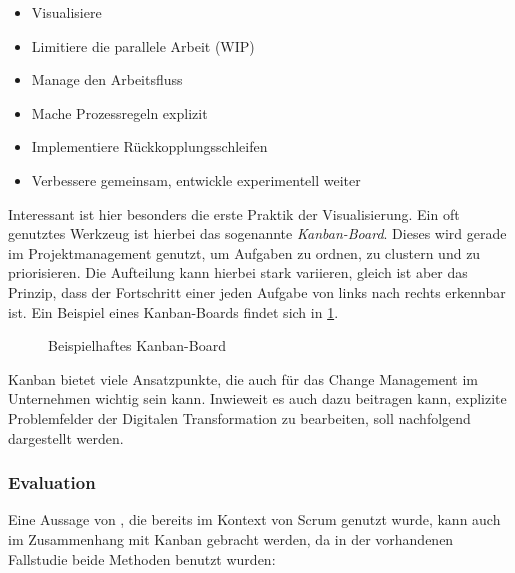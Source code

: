 \begin{itemize}[noitemsep, topsep=0pt]
	\item Visualisiere
	\item Limitiere die parallele Arbeit (WIP)
	\item Manage den Arbeitsfluss
	\item Mache Prozessregeln explizit
	\item Implementiere Rückkopplungsschleifen
	\item Verbessere gemeinsam, entwickle experimentell weiter
\end{itemize}

Interessant ist hier besonders die erste Praktik der Visualisierung. Ein oft genutztes Werkzeug ist hierbei das sogenannte \textit{Kanban-Board}. Dieses wird gerade im Projektmanagement genutzt, um Aufgaben zu ordnen, zu clustern und zu priorisieren. Die Aufteilung kann hierbei stark variieren, gleich ist aber das Prinzip, dass der Fortschritt einer jeden Aufgabe von links nach rechts erkennbar ist. \cite[S. 21]{anderson_essenz_2018} Ein Beispiel eines Kanban-Boards findet sich in \ref{fig:kanban}.

\begin{figure}[H]
	\centering
	\caption[Beispielhaftes Kanban-Board]{Beispielhaftes Kanban-Board \protect \cite[S. 15]{anderson_essenz_2018}}
	\label{fig:kanban}
\end{figure}

Kanban bietet viele Ansatzpunkte, die auch für das Change Management im Unternehmen wichtig sein kann. Inwieweit es auch dazu beitragen kann, explizite Problemfelder der Digitalen Transformation zu bearbeiten, soll nachfolgend dargestellt werden.

\subsubsection{Evaluation}

Eine Aussage von , die bereits im Kontext von Scrum genutzt wurde, kann auch im Zusammenhang mit Kanban gebracht werden, da in der vorhandenen Fallstudie beide Methoden benutzt wurden:


